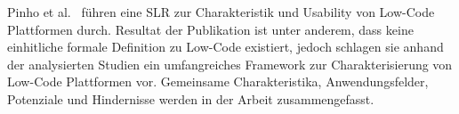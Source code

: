 Pinho et al.~\cite{pinho2023usability} führen eine SLR zur Charakteristik und Usability von Low-Code Plattformen durch. 
Resultat der Publikation ist unter anderem, dass keine einhitliche formale Definition zu Low-Code existiert, jedoch 
schlagen sie anhand der analysierten Studien ein umfangreiches Framework zur Charakterisierung von Low-Code Plattformen vor. 
Gemeinsame Charakteristika, Anwendungsfelder, Potenziale und Hindernisse werden in der Arbeit zusammengefasst. 

